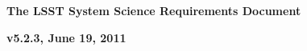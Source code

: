 \documentclass[11pt,letterpaper]{article}
\newcommand{\R}[1]{#1}
\begin{document}

\centerline{\Large\bf The LSST System Science Requirements Document}
\centerline{\large\bf v5.2.3, June 19, 2011}











\newpage
\printglossary
\end{document}
